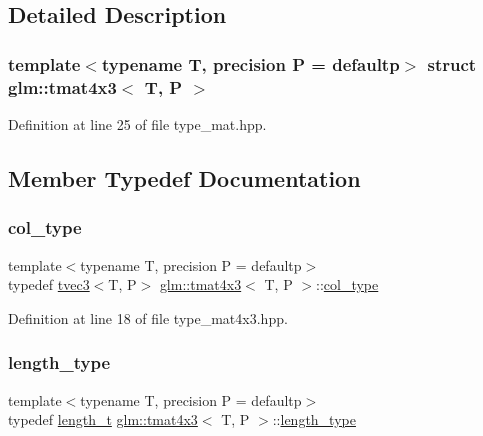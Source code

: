 \subsection{Detailed Description}
\subsubsection*{template$<$typename T, precision P = defaultp$>$\newline
struct glm\+::tmat4x3$<$ T, P $>$}



Definition at line 25 of file type\+\_\+mat.\+hpp.



\subsection{Member Typedef Documentation}
\mbox{\label{structglm_1_1tmat4x3_ac64f78f27c32014f7d72233969526430}} 
\subsubsection{\texorpdfstring{col\_type}{col\_type}}
{\footnotesize\ttfamily template$<$typename T, precision P = defaultp$>$ \\
typedef \mbox{\hyperlink{structglm_1_1tvec3}{tvec3}}$<$T, P$>$ \mbox{\hyperlink{structglm_1_1tmat4x3}{glm\+::tmat4x3}}$<$ T, P $>$\+::\mbox{\hyperlink{structglm_1_1tmat4x3_ac64f78f27c32014f7d72233969526430}{col\+\_\+type}}}



Definition at line 18 of file type\+\_\+mat4x3.\+hpp.

\mbox{\label{structglm_1_1tmat4x3_a2f1ac502cc552a921a905e8a858fb1d7}} 
\subsubsection{\texorpdfstring{length\_type}{length\_type}}
{\footnotesize\ttfamily template$<$typename T, precision P = defaultp$>$ \\
typedef \mbox{\hyperlink{namespaceglm_a090a0de2260835bee80e71a702492ed9}{length\+\_\+t}} \mbox{\hyperlink{structglm_1_1tmat4x3}{glm\+::tmat4x3}}$<$ T, P $>$\+::\mbox{\hyperlink{structglm_1_1tmat4x3_a2f1ac502cc552a921a905e8a858fb1d7}{length\+\_\+type}}}



